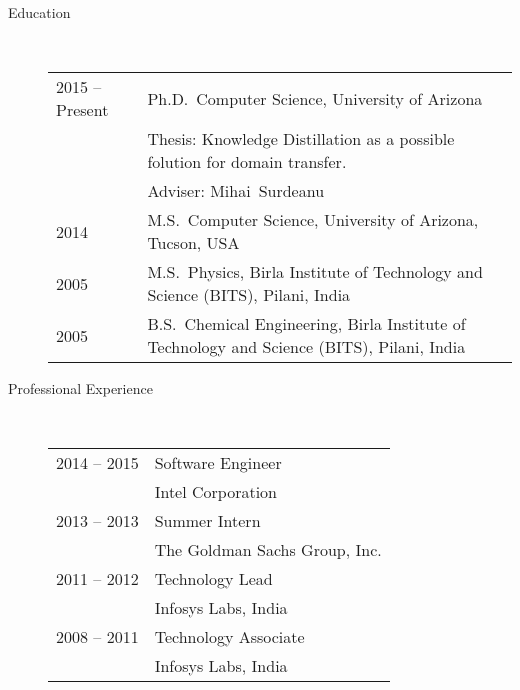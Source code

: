 \documentclass[10pt]{article}
\begin{document}
\begin{description}

\item [Education]\

\begin{tabular}{lp{4.5in}}
\hspace{-.2cm}2015 -- Present &  Ph.D.~Computer Science, {\sc University of Arizona}
\\\vspace{.0cm}&Thesis: Knowledge Distillation as a possible folution for domain transfer. 
\\\vspace{.1cm}& Adviser: Mihai~Surdeanu\\
\vspace{.1cm}\hspace{-.2cm}2014 &  M.S.~Computer Science, {\sc University of Arizona, Tucson, USA} \\
\vspace{.1cm}\hspace{-.2cm}2005 &  M.S.~Physics, {\sc Birla Institute of Technology and Science (BITS), Pilani, India} \\
\hspace{-.2cm}2005 & B.S.~Chemical Engineering,  {\sc Birla Institute of Technology and Science (BITS), Pilani, India}
\end{tabular}


\item [Professional Experience]\

\begin{tabular}{lp{4.9in}}


\hspace{-.2cm}2014 -- 2015 & Software Engineer\\\vspace{.1cm}
& {\sc Intel Corporation} \\

\hspace{-.2cm}2013 -- 2013 & Summer Intern\\\vspace{.1cm}
& {\sc The Goldman Sachs Group, Inc.} \\

\hspace{-.2cm}2011 -- 2012 & Technology Lead\\\vspace{.1cm}
&  {\sc Infosys Labs, India} \\

\hspace{-.2cm}2008 -- 2011 & Technology Associate\\\vspace{.1cm}
& {\sc Infosys Labs, India} \\


\end{tabular}
\end{description}
\end{document}
